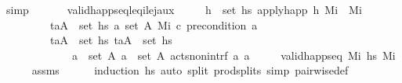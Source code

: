 \begin{isabellebody}
\ simp\isanewline
\ \ \isamarkupfalse%
%
\endisatagproof
{\isafoldproof}%
%
\isadelimproof
\isanewline
%
\endisadelimproof
\isanewline
\ \ \isamarkupfalse%
\ valid{\isacharunderscore}{\kern0pt}happ{\isacharunderscore}{\kern0pt}seq{\isacharunderscore}{\kern0pt}leq\isactrlsub i{\isacharunderscore}{\kern0pt}le\isactrlsub j{\isacharunderscore}{\kern0pt}aux{}{\isacharcolon}{\kern0pt}\isanewline
\ \ \ \ \ {\isachardoublequoteopen}{\isasymforall}h\ {\isasymin}\ set\ hs{\isachardot}{\kern0pt}\ apply{\isacharunderscore}{\kern0pt}happ\ h\ M\isactrlsub i\ {\isacharequal}{\kern0pt}\ M\isactrlsub i{\isachardoublequoteclose}\isanewline
\ \ \ \ \ \ \ \ \ {\isachardoublequoteopen}{\isasymforall}{\isacharparenleft}{\kern0pt}t\isactrlsub a{\isacharcomma}{\kern0pt}A{\isacharparenright}{\kern0pt}\ {\isasymin}\ set\ hs{\isachardot}{\kern0pt}\ {\isasymforall}a{\isasymin}\ set\ A{\isachardot}{\kern0pt}\ M\isactrlsub i\ \isactrlsup c{\isasymTTurnstile}\isactrlsub {\isacharequal}{\kern0pt}\ precondition\ a{\isachardoublequoteclose}\isanewline
\ \ \ \ \ \ \ \ \ {\isachardoublequoteopen}{\isasymforall}{\isacharparenleft}{\kern0pt}t\isactrlsub a{\isacharcomma}{\kern0pt}A{\isacharparenright}{\kern0pt}\ {\isasymin}\ set\ hs{\isachardot}{\kern0pt}\ {\isasymforall}{\isacharparenleft}{\kern0pt}t\isactrlsub a{\isacharprime}{\kern0pt}{\isacharcomma}{\kern0pt}A{\isacharprime}{\kern0pt}{\isacharparenright}{\kern0pt}\ {\isasymin}\ set\ hs{\isachardot}{\kern0pt}\ \isanewline
\ \ \ \ \ \ \ \ \ \ \ \ \ {\isasymforall}a\ {\isasymin}\ set\ A{\isachardot}{\kern0pt}\ {\isasymforall}a{\isacharprime}{\kern0pt}\ {\isasymin}\ set\ A{\isacharprime}{\kern0pt}{\isachardot}{\kern0pt}\ acts{\isacharunderscore}{\kern0pt}non{\isacharunderscore}{\kern0pt}intrf\ a\ a{\isacharprime}{\kern0pt}{\isachardoublequoteclose}\isanewline
\ \ \ \ \ {\isachardoublequoteopen}valid{\isacharunderscore}{\kern0pt}happ{\isacharunderscore}{\kern0pt}seq\ M\isactrlsub i\ hs\ M\isactrlsub i{\isachardoublequoteclose}\isanewline
%
\isadelimproof
\ \ \ \ %
\endisadelimproof
%
\isatagproof
{}\isamarkupfalse%
\ assms\isanewline
\ \ \ \ \isamarkupfalse%
\ {\isacharparenleft}{\kern0pt}induction\ hs{\isacharparenright}{\kern0pt}\ {\isacharparenleft}{\kern0pt}auto\ split{\isacharcolon}{\kern0pt}\ prod{\isachardot}{\kern0pt}splits\ simp{\isacharcolon}{\kern0pt}\ pairwise{\isacharunderscore}{\kern0pt}def{\isacharparenright}{\kern0pt}%
\endisatagproof
{\isafoldproof}%
%
\isadelimproof

\end{isabellebody}
